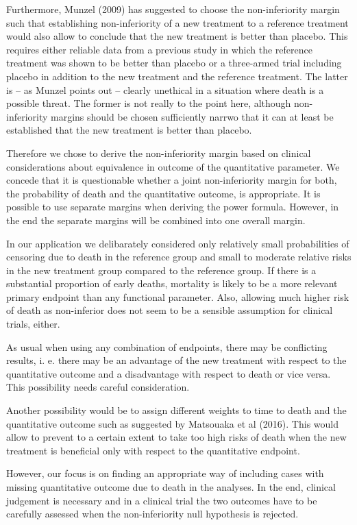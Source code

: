 \documentclass[bimj,fleqn]{w-art}\usepackage[]{graphicx}\usepackage[]{color}
\theoremstyle{plain}
\theoremstyle{definition}
\begin{document}
Furthermore, Munzel (2009) has suggested to choose the non-inferiority margin
such that establishing non-inferiority of a new treatment to a reference
treatment would also allow to conclude that the new treatment is better than
placebo. This requires either reliable data from a previous study in which the
reference treatment was shown to be better than placebo or a three-armed trial
including placebo in addition to the new treatment and the reference treatment.
The latter is -- as Munzel points out -- clearly unethical in a situation where
death is a possible threat. The former is not really to the point here, although
non-inferiority margins should be chosen sufficiently narrwo that it can at
least be established that the new treatment is better than placebo.

Therefore we chose to derive the non-inferiority margin based on clinical
considerations about equivalence in outcome of the quantitative parameter. We
concede that it is questionable whether a joint non-inferiority margin for both,
the probability of death and the quantitative outcome, is appropriate. It is
possible to use separate margins when deriving the power formula. However, in
the end the separate margins will be combined into one overall margin.

In our application we delibarately considered only relatively small probabilities
of censoring due to death in the reference group and small to moderate relative
risks in the new treatment group compared to the reference group. If there is a
substantial proportion of early deaths, mortality is likely to be a more relevant
primary endpoint than any functional parameter. Also, allowing much higher risk
of death as non-inferior does not seem to be a sensible assumption for clinical
trials, either.

As usual when using any combination of endpoints, there may be conflicting
results, i. e. there may be an advantage of the new treatment with respect to
the quantitative outcome and a disadvantage with respect to death or vice versa.
This possibility needs careful consideration.

Another possibility would be to assign different weights to time to death and
the quantitative outcome such as suggested by Matsouaka et al (2016). This would
allow to prevent to a certain extent to take too high risks of death when the
new treatment is beneficial only with respect to the quantitative endpoint.

However, our focus is on finding an appropriate way of including cases with
missing quantitative outcome due to death in the analyses. In the end, clinical
judgement is necessary and in a clinical trial the two outcomes have to be
carefully assessed when the non-inferiority null hypothesis is rejected.
\end{document}
